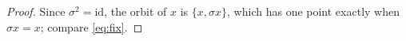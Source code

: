 \begin{proof}
Since $\sigma^2=\mathrm{id}$, the orbit of $x$ is $\{x,\sigma x\}$, which has one point exactly when $\sigma x = x$; compare \eqref{eq:fix}.
\end{proof}